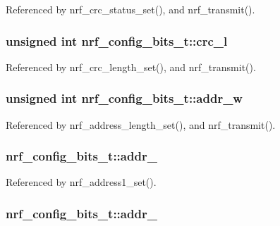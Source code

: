 Referenced by nrf\_\-crc\_\-status\_\-set(), and nrf\_\-transmit().\hypertarget{structnrf__config__bits__t_c92bc2e054e12c9d6280b98bc329e2cf}{
\subsubsection{\setlength{\rightskip}{0pt plus 5cm}unsigned int {\bf nrf\_\-config\_\-bits\_\-t::crc\_\-l}}}
\label{structnrf__config__bits__t_c92bc2e054e12c9d6280b98bc329e2cf}




Referenced by nrf\_\-crc\_\-length\_\-set(), and nrf\_\-transmit().\hypertarget{structnrf__config__bits__t_502ae4e72d50d451dfeb3ea676bad844}{
\subsubsection{\setlength{\rightskip}{0pt plus 5cm}unsigned int {\bf nrf\_\-config\_\-bits\_\-t::addr\_\-w}}}
\label{structnrf__config__bits__t_502ae4e72d50d451dfeb3ea676bad844}




Referenced by nrf\_\-address\_\-length\_\-set(), and nrf\_\-transmit().\hypertarget{structnrf__config__bits__t_6d67ab223708c6ddd9e98123a185c5de}{
\subsubsection{ {\bf nrf\_\-config\_\-bits\_\-t::addr\_}}}
\label{structnrf__config__bits__t_6d67ab223708c6ddd9e98123a185c5de}




Referenced by nrf\_\-address1\_\-set().\hypertarget{structnrf__config__bits__t_97d736891f34778ce763c7c59c8fd772}{
\subsubsection{ {\bf nrf\_\-config\_\-bits\_\-t::addr\_}}}
\label{structnrf__config__bits__t_97d736891f34778ce763c7c59c8fd772}




